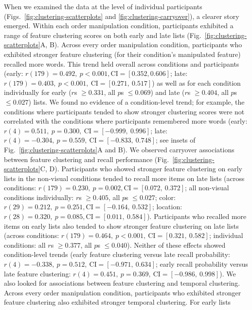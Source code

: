 \documentclass[11pt]{article}
\begin{document}
When we examined the data at the level of individual participants
(Figs.~\ref{fig:clustering-scatterplots} and \ref{fig:clustering-carryover}), a
clearer story emerged. Within each order manipulation condition, participants
exhibited a range of feature clustering scores on both early and late lists
(Fig.~\ref{fig:clustering-scatterplots}A, B). Across every order manipulation
condition, participants who exhibited stronger feature clustering (for their
condition's manipulated feature) recalled more words. This trend held overall
across conditions and participants (early: $r(179) = 0.492,~p < 0.001,
\mathrm{CI} = [0.352, 0.606]$; late: $r(179) = 0.403,~p < 0.001,~\mathrm{CI} =
[0.271,~0.517]$) as well as for each condition individually for early ($r$s
$\geq 0.331$, all $p$s $\leq 0.069$) and late ($r$s $\geq 0.404$, all $p$s
$\leq 0.027$) lists. We found no evidence of a condition-level trend; for
example, the conditions where participants tended to show stronger clustering
scores were not correlated with the conditions where participants remembered
more words (early: $r(4) = 0.511,~p = 0.300,~\mathrm{CI} = [-0.999,~0.996]$;
late: $r(4) = -0.304,~p = 0.559,~\mathrm{CI} = [-0.833,~0.748]$; see insets of
Fig.~\ref{fig:clustering-scatterplots}A and B). We observed carryover
associations between feature clustering and recall performance
(Fig.~\ref{fig:clustering-scatterplots}C, D). Participants who showed stronger
feature clustering on early lists in the non-visual conditions tended to recall
more items on late lists (across conditions: $r(179) = 0.230,~p = 0.002,
\mathrm{CI} = [0.072,~0.372]$; all non-visual conditions individually: $r$s
$\geq 0.405$, all $p$s $\leq 0.027$; color: $r(29) = 0.212,~p = 0.251,
\mathrm{CI} = [-0.164,~0.532]$; location: $r(28) = 0.320,~p = 0.085,
\mathrm{CI} = [0.011,~0.584]$). Participants who recalled more items on early
lists also tended to show stronger feature clustering on late lists (across
conditions: $r(179) = 0.464,~p < 0.001,~\mathrm{CI} = [0.321,~0.582]$;
individual conditions: all $r$s $\geq 0.377$, all $p$s $\leq 0.040$). Neither
of these effects showed condition-level trends (early feature clustering versus
late recall probability: $r(4) = -0.338,~p = 0.512,~\mathrm{CI} = [-0.971,~
0.634]$; early recall probability versus late feature clustering: $r(4) =
0.451,~p = 0.369,~\mathrm{CI} = [-0.986,~0.998]$). We also looked for
associations between feature clustering and temporal clustering. Across every
order manipulation condition, participants who exhibited stronger feature
clustering also exhibited stronger temporal clustering. For early lists
\end{document}
